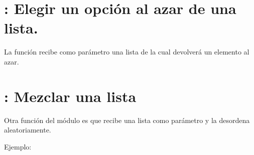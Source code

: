 \documentclass[a4paper,12pt,spanish]{sphinxmanual}
\begin{document}
\section{: Elegir un opción al azar de una lista.}
\label{\detokenize{random:choice-elegir-un-opcion-al-azar-de-una-lista}}
\sphinxAtStartPar
La función  recibe como parámetro una lista de la cual
devolverá un elemento al azar.

\begin{sphinxVerbatim}[commandchars=\\\{\}]
   

  \PYG{p}{[}  \PYG{p}{]}
  
\end{sphinxVerbatim}


\section{: Mezclar una lista}
\label{\detokenize{random:shuffle-mezclar-una-lista}}
\sphinxAtStartPar
Otra función del módulo  es  que recibe una lista
como parámetro y la desordena aleatoriamente.

\sphinxAtStartPar
Ejemplo:
\end{document}
